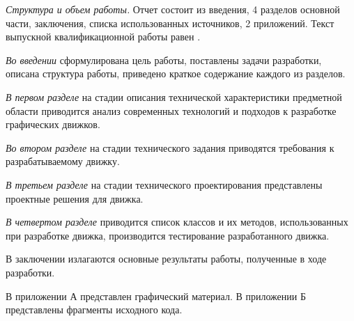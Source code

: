 \emph{Структура и объем работы.} Отчет состоит из введения, 4 разделов основной части, заключения, списка использованных источников, 2 приложений. Текст выпускной квалификационной работы равен .

\emph{Во введении} сформулирована цель работы, поставлены задачи разработки, описана структура работы, приведено краткое содержание каждого из разделов.

\emph{В первом разделе} на стадии описания технической характеристики предметной области приводится анализ современных технологий и подходов к разработке графических движков.

\emph{Во втором разделе} на стадии технического задания приводятся требования к разрабатываемому движку.

\emph{В третьем разделе} на стадии технического проектирования представлены проектные решения для движка.

\emph{В четвертом разделе} приводится список классов и их методов, использованных при разработке движка, производится тестирование разработанного движка.

В заключении излагаются основные результаты работы, полученные в ходе разработки.

В приложении А представлен графический материал.
В приложении Б представлены фрагменты исходного кода. 
